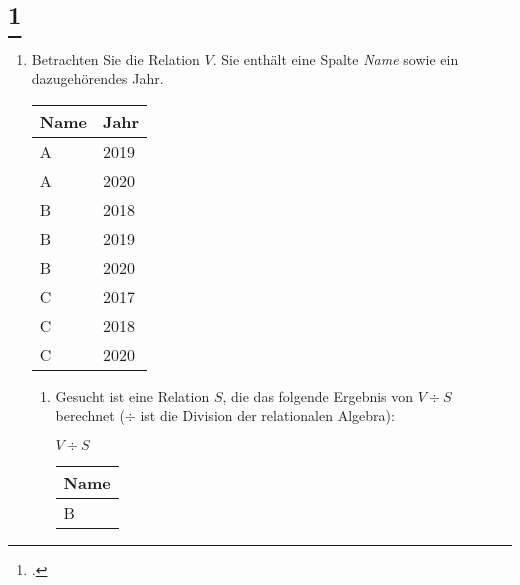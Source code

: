 \documentclass{lehramt-informatik-aufgabe}
\begin{document}
\section{
\footcite{examen:66116:2020:09}}
\begin{enumerate}


\begin{verbatim}
CREATE TABLE V (
  Name VARCHAR(1),
  Jahr integer
);

CREATE TABLE S (
  Jahr integer
);

INSERT INTO V VALUES
  ('A', 2019),
  ('A', 2020),
  ('B', 2018),
  ('B', 2019),
  ('B', 2020),
  ('C', 2017),
  ('C', 2018),
  ('C', 2020);

INSERT INTO S VALUES
  (2018),
  (2019),
  (2020);
\end{verbatim}

\item Betrachten Sie die Relation $V$. Sie enthält eine Spalte
\emph{Name} sowie ein dazugehörendes Jahr.

\begin{center}
\begin{tabular}{|l|l|}
\hline
Name & Jahr \\\hline\hline
A & 2019 \\\hline
A & 2020 \\\hline
B & 2018 \\\hline
B & 2019 \\\hline
B & 2020 \\\hline
C & 2017 \\\hline
C & 2018 \\\hline
C & 2020 \\\hline
\end{tabular}
\end{center}

\begin{enumerate}


\item Gesucht ist eine Relation $S$, die das folgende Ergebnis von $V
\div S$ berechnet ($\div$ ist die Division der relationalen Algebra):

$V \div S$

\begin{center}

\begin{tabular}{|l|}
\hline
Name \\\hline\hline
B \\\hline
\end{tabular}
\end{center}


\end{enumerate}
\end{enumerate}
\end{document}
